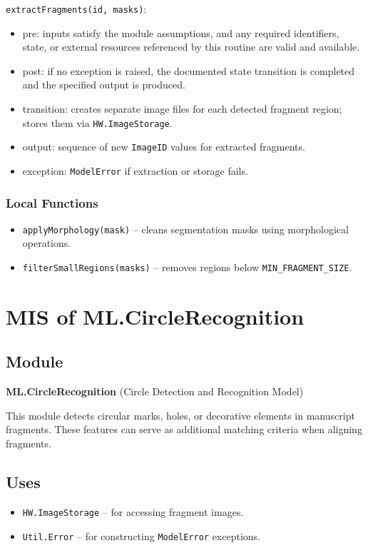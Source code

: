 \documentclass[12pt, titlepage]{article}
\begin{document}
\noindent \texttt{extractFragments(id, masks)}:
\begin{itemize}
    \item pre: inputs satisfy the module assumptions, and any required identifiers, state, or external resources referenced by this routine are valid and available.
    \item post: if no exception is raised, the documented state transition is completed and the specified output is produced.
    \item transition: creates separate image files for each detected fragment region; stores them via \texttt{HW.ImageStorage}.
    \item output: sequence of new \texttt{ImageID} values for extracted fragments.
    \item exception: \texttt{ModelError} if extraction or storage fails.
\end{itemize}

\subsubsection{Local Functions}
\begin{itemize}
    \item \texttt{applyMorphology(mask)} – cleans segmentation masks using morphological operations.
    \item \texttt{filterSmallRegions(masks)} – removes regions below \texttt{MIN\_FRAGMENT\_SIZE}.
\end{itemize}



\section{MIS of ML.CircleRecognition} \label{ML.CircleRecognition}

\subsection{Module}
\textbf{ML.CircleRecognition} \; (Circle Detection and Recognition Model)

This module detects circular marks, holes, or decorative elements in manuscript fragments. These features can serve as additional matching criteria when aligning fragments.

\subsection{Uses}
\begin{itemize}
    \item \texttt{HW.ImageStorage} – for accessing fragment images.
    \item \texttt{Util.Error} – for constructing \texttt{ModelError} exceptions.
\end{itemize}
\end{document}

